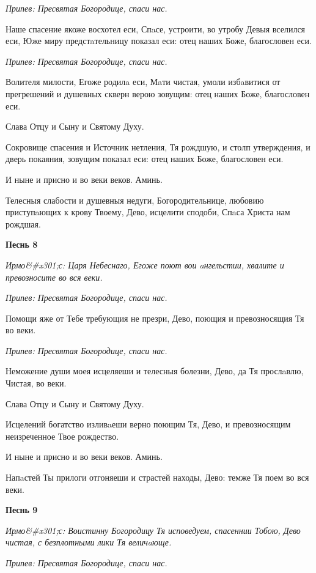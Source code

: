 \itshape Припев:\normalfont{} Пресвятая Богородице, спаси нас.


Наше спасение якоже восхотел еси, Спaсе, устроити, во утробу Девыя вселился еси, Юже миру предстaтельницу показал еси: отец наших Боже, благословен еси.


\itshape Припев:\normalfont{} Пресвятая Богородице, спаси нас.


Волителя милости, Егоже родилa еси, Мaти чистая, умоли избaвитися от прегрешений и душевных скверн верою зовущим: отец наших Боже, благословен еси.


Слава Отцу и Сыну и Святому Духу.


Сокровище спасения и Источник нетления, Тя рождшую, и столп утверждения, и дверь покаяния, зовущим показал еси: отец наших Боже, благословен еси.


И ныне и присно и во веки веков. Аминь.


Телесныя слабости и душевныя недуги, Богородительнице, любовию приступaющих к крову Твоему, Дево, исцелити сподоби, Спaса Христа нам рождшая.




\bfseries Песнь 8\normalfont{}


\itshape Ирмо&#x301;с:\normalfont{} Царя Небеснаго, Егоже поют вои aнгельстии, хвалите и превозносите во вся веки.


\itshape Припев:\normalfont{} Пресвятая Богородице, спаси нас.


Помощи яже от Тебе требующия не презри, Дево, поющия и превозносящия Тя во веки.


\itshape Припев:\normalfont{} Пресвятая Богородице, спаси нас.


Неможение души моея исцеляеши и телесныя болезни, Дево, да Тя прослaвлю, Чистая, во веки.


Слава Отцу и Сыну и Святому Духу.


Исцелений богатство изливaеши верно поющим Тя, Дево, и превозносящим неизреченное Твое рождество.


И ныне и присно и во веки веков. Аминь.


Напaстей Ты прилоги отгоняеши и страстей находы, Дево: темже Тя поем во вся веки.




\bfseries Песнь 9\normalfont{}


\itshape Ирмо&#x301;с:\normalfont{} Воистинну Богородицу Тя исповедуем, спасеннии Тобою, Дево чистая, с безплотными лики Тя величaюще.


\itshape Припев:\normalfont{} Пресвятая Богородице, спаси нас.


